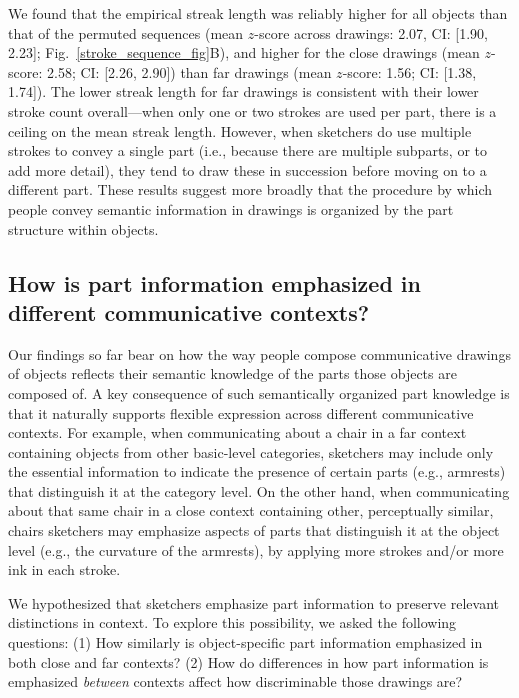 \documentclass[10pt,letterpaper]{article}
\newcommand{\kushin}[1]{{\color{orange}{[kushin: #1]}}}
\begin{document}

We found that the empirical streak length was reliably higher for all objects than that of the permuted sequences (mean $z$-score across drawings: 2.07, CI: [1.90, 2.23]; Fig.~\ref{stroke_sequence_fig}B), and higher for the close drawings (mean $z$-score: 2.58; CI: [2.26, 2.90]) than far drawings (mean $z$-score: 1.56; CI: [1.38, 1.74]).
The lower streak length for far drawings is consistent with their lower stroke count overall---when only one or two strokes are used per part, there is a ceiling on the mean streak length. 
However, when sketchers do use multiple strokes to convey a single part (i.e., because there are multiple subparts, or to add more detail), they tend to draw these in succession before moving on to a different part.
These results suggest more broadly that the procedure by which people convey semantic information in drawings is organized by the part structure within objects.

\subsection{How is part information emphasized in different communicative contexts?}

Our findings so far bear on how the way people compose communicative drawings of objects reflects their semantic knowledge of the parts those objects are composed of.
A key consequence of such semantically organized part knowledge is that it naturally supports flexible expression across different communicative contexts. 
For example, when communicating about a chair in a far context containing objects from other basic-level categories, sketchers may include only the essential information to indicate the presence of certain parts (e.g., armrests) that distinguish it at the category level. 
On the other hand, when communicating about that same chair in a close context containing other, perceptually similar, chairs sketchers may emphasize aspects of parts that distinguish it at the object level (e.g., the curvature of the armrests), by applying more strokes and/or more ink in each stroke.

We hypothesized that sketchers emphasize part information to preserve relevant distinctions in context. 
To explore this possibility, we asked the following questions: 
(1) How similarly is object-specific part information emphasized in both close and far contexts? 
(2) How do differences in how part information is emphasized \textit{between} contexts affect how discriminable those drawings are?
\end{document}

